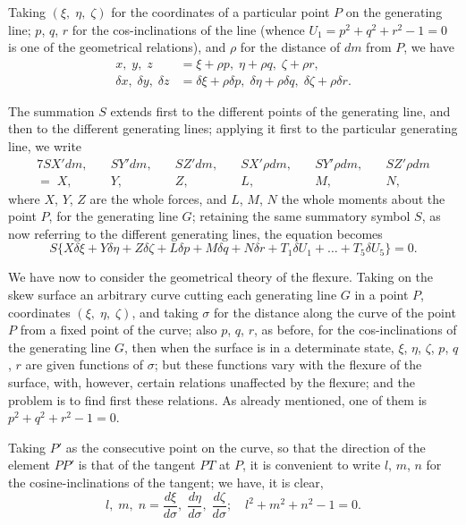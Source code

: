 \documentclass[11pt,a4paper]{book}
\begin{document}
Taking $(\xi,\; \eta,\; \zeta)$ for the coordinates of a particular point $P$ on the generating line; $p$, $q$, $r$ for the cos-inclinations of the line (whence $U_1 = p^2 + q^2 + r^2 - 1 = 0$ is one of the geometrical relations), and $\rho$ for the distance of $dm$ from $P$, we have
\begin{align*}
x,\; y,\; z &= \xi + \rho p,\; \eta + \rho q,\; \zeta + \rho r, \\
\delta x,\; \delta y,\; \delta z &= \delta\xi + \rho\delta p,\; \delta\eta + \rho\delta q,\; \delta\zeta + \rho\delta r.
\end{align*}

The summation $S$ extends first to the different points of the generating line, and then to the different generating lines; applying it first to the particular generating line, we write
\begin{alignat*}{7}
SX'dm,\quad &SY'dm,\quad &SZ'dm,\quad &SX'\rho dm,\quad &SY'\rho dm,\quad &SZ'\rho dm \\
=\; X,\quad &Y,\quad &Z,\quad &L,\quad &M,\quad &N,
\end{alignat*}
where $X$, $Y$, $Z$ are the whole forces, and $L$, $M$, $N$ the whole moments about the point $P$, for the generating line $G$; retaining the same summatory symbol $S$, as now referring to the different generating lines, the equation becomes
\[
S\{X\delta\xi + Y\delta\eta + Z\delta\zeta + L\delta p + M\delta q + N\delta r + T_1\delta U_1 + \ldots + T_5\delta U_5\} = 0.
\]

We have now to consider the geometrical theory of the flexure. Taking on the skew surface an arbitrary curve cutting each generating line $G$ in a point $P$, coordinates $(\xi,\; \eta,\; \zeta)$, and taking $\sigma$ for the distance along the curve of the point $P$ from a fixed point of the curve; also $p$, $q$, $r$, as before, for the cos-inclinations of the generating line $G$, then when the surface is in a determinate state, $\xi$, $\eta$, $\zeta$, $p$, $q$, $r$ are given functions of $\sigma$; but these functions vary with the flexure of the surface, with, however, certain relations unaffected by the flexure; and the problem is to find first these relations. As already mentioned, one of them is $p^2 + q^2 + r^2 - 1 = 0$.

Taking $P'$ as the consecutive point on the curve, so that the direction of the element $PP'$ is that of the tangent $PT$ at $P$, it is convenient to write $l$, $m$, $n$ for the cosine-inclinations of the tangent; we have, it is clear,
\[
l,\; m,\; n = \frac{d\xi}{d\sigma},\; \frac{d\eta}{d\sigma},\; \frac{d\zeta}{d\sigma};\quad l^2 + m^2 + n^2 - 1 = 0.
\]
\end{document}
